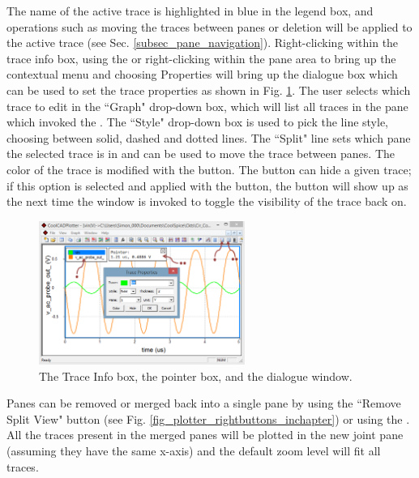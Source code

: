 The name of the active trace is highlighted in blue in the legend box, and operations such as moving the traces between panes or deletion will be applied to the active trace (see Sec. \ref{subsec_pane_navigation}).  Right-clicking within the trace info box, using the  or right-clicking within the pane area to bring up the contextual menu and choosing \textsf{Properties} will bring up the dialogue box which can be used to set the trace properties as shown in Fig. \ref{fig_plotter_legendpointerboxes_traceprops}.  The user selects which trace to edit in the ``\textsf{Graph}" drop-down box, which will list all traces in the pane which invoked the .  The ``\textsf{Style}" drop-down box is used to pick the line style, choosing between solid, dashed and dotted lines.  The ``\textsf{Split}" line sets which pane the selected trace is in and can be used to move the trace between panes.  The color of the trace is modified with the  button.  The  button can hide a given trace; if this option is selected and applied with the  button, the button will show up as  the next time the  window is invoked to toggle the visibility of the trace back on.  

\begin{figure}
    \includegraphics[width=0.6\textwidth]{./figures/plotter_netlist_editor_figures/Plotter_Legend_Pointer_Properties_Boxes.png}
    \caption{{The Trace Info box, the pointer box, and the  dialogue window.}}
  \label{fig_plotter_legendpointerboxes_traceprops}
\end{figure}

 Panes can be removed or merged back into a single pane by using the ``Remove Split View" button (see Fig. \ref{fig_plotter_rightbuttons_inchapter}) or using the .  All the traces present in the merged panes will be plotted in the new joint pane (assuming they have the same x-axis) and the default zoom level will fit all traces.



